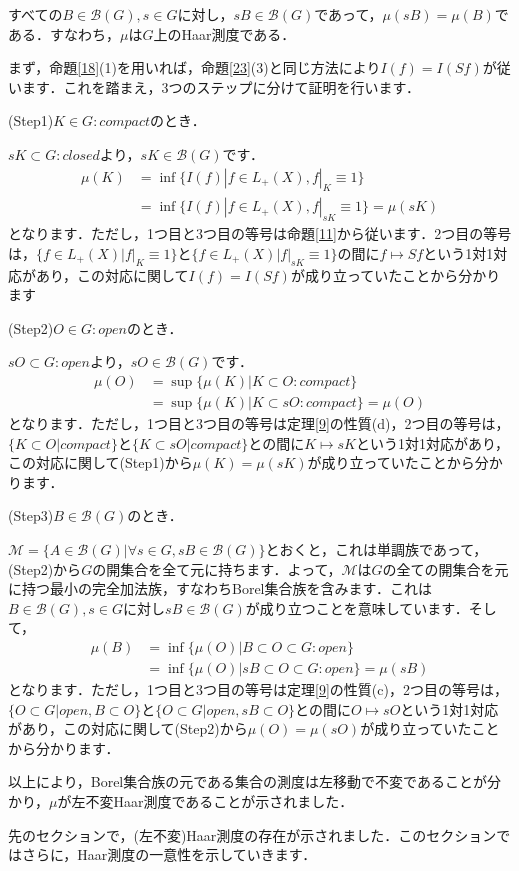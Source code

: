 \begin{prop}\label{25}
すべての$B \in \mathscr{B}(G), s \in G$に対し，$sB \in \mathscr{B}(G)$であって，$\mu(sB)=\mu(B)$である．すなわち，$\mu$は$G$上のHaar測度である．
\end{prop}
\begin{Proof}
まず，命題\ref{18}(1)を用いれば，命題\ref{23}(3)と同じ方法により$I(f)=I(Sf)$が従います．これを踏まえ，3つのステップに分けて証明を行います．

(Step1)$K \in G \colon compact$のとき．

$sK \subset G \colon closed$より，$sK \in  \mathscr{B}(G)$です．
\begin{align*}
\mu(K) & = \inf \{ I(f) | f \in L_{+}(X), f|_{K} \equiv 1 \} \\
 & =\inf \{ I(f) | f \in L_{+}(X), f|_{sK} \equiv 1 \}=\mu(sK)
\end{align*}
となります．ただし，1つ目と3つ目の等号は命題\ref{11}から従います．2つ目の等号は，$\{ f \in L_{+}(X) | f|_{K} \equiv 1 \}$と$\{ f \in L_{+}(X) | f|_{sK} \equiv 1 \}$の間に$f \mapsto Sf$という1対1対応があり，この対応に関して$I(f)=I(Sf)$が成り立っていたことから分かります

(Step2)$O \in G \colon open$のとき．

$sO \subset G \colon open$より，$sO \in \mathscr{B}(G)$です．
\begin{align*}
\mu(O) & = \sup \{ \mu(K) | K \subset O \colon compact \} \\
 & =\sup \{ \mu(K) | K \subset sO \colon compact \} = \mu (O)
\end{align*}
となります．ただし，1つ目と3つ目の等号は定理\ref{9}の性質(d)，2つ目の等号は，$\{ K \subset O | compact \}$と$\{ K \subset sO | compact \}$との間に$K \mapsto sK$という1対1対応があり，この対応に関して(Step1)から$\mu(K)=\mu(sK)$が成り立っていたことから分かります．

(Step3)$B \in \mathscr{B}(G)$のとき．

$\mathscr{M}=\{A \in \mathscr{B}(G) | \forall s \in G , sB \in \mathscr{B}(G) \}$とおくと，これは単調族であって，(Step2)から$G$の開集合を全て元に持ちます．よって，$\mathscr{M}$は$G$の全ての開集合を元に持つ最小の完全加法族，すなわちBorel集合族を含みます．これは$B \in \mathscr{B}(G), s \in G$に対し$ sB \in \mathscr{B}(G)$が成り立つことを意味しています．そして，
\begin{align*}
\mu(B) & = \inf \{ \mu(O) | B \subset O \subset G \colon open\} \\
 & = \inf \{ \mu(O) | sB \subset O \subset G \colon open\} = \mu(sB)
\end{align*}
となります．ただし，1つ目と3つ目の等号は定理\ref{9}の性質(c)，2つ目の等号は，$\{ O \subset G | open, B \subset O \}$と$\{ O \subset G | open, sB \subset O \}$との間に$O \mapsto sO$という1対1対応があり，この対応に関して(Step2)から$\mu(O)=\mu(sO)$が成り立っていたことから分かります．

以上により，Borel集合族の元である集合の測度は左移動で不変であることが分かり，$\mu$が左不変Haar測度であることが示されました．　
\end{Proof}
先のセクションで，(左不変)Haar測度の存在が示されました．このセクションではさらに，Haar測度の一意性を示していきます．

